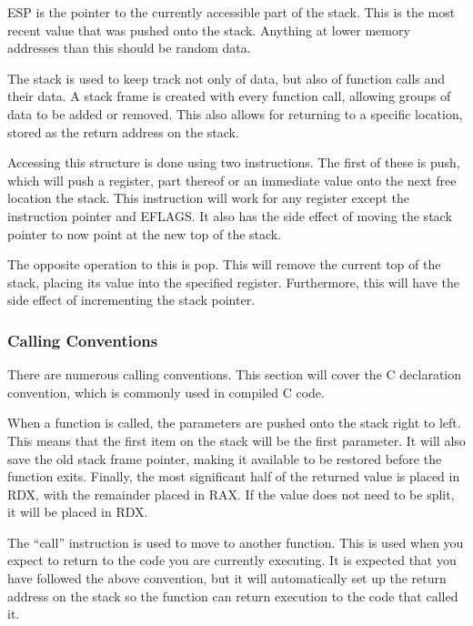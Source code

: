 				ESP is the pointer to the currently accessible part of the stack. 
				This is the most recent value that was pushed onto the stack. 
				Anything at lower memory addresses than this should be random data. 
				
				The stack is used to keep track not only of data, but also of function calls and their data. 
				A stack frame is created with every function call, allowing groups of data to be added or removed. 
				This also allows for returning to a specific location, stored as the return address on the stack. 

				Accessing this structure is done using two instructions. 
				The first of these is push, which will push a register, part thereof or an immediate value onto the next free location the stack. 
				This instruction will work for any register except the instruction pointer and EFLAGS. 
				It also has the side effect of moving the stack pointer to now point at the new top of the stack. 

				The opposite operation to this is pop. 
				This will remove the current top of the stack, placing its value into the specified register. 
				Furthermore, this will have the side effect of incrementing the stack pointer. 

			\subsubsection{Calling Conventions}
				There are numerous calling conventions. 
				This section will cover the C declaration convention, which is commonly used in compiled C code. 

				When a function is called, the parameters are pushed onto the stack right to left. 
				This means that the first item on the stack will be the first parameter. 
				It will also save the old stack frame pointer, making it available to be restored before the function exits. 
				Finally, the most significant half of the returned value is placed in RDX, with the remainder placed in RAX. 
				If the value does not need to be split, it will be placed in RDX. 

				The ``call'' instruction is used to move to another function. 
				This is used when you expect to return to the code you are currently executing.
				It is expected that you have followed the above convention, but it will automatically set up the return address on the stack so the function can return execution to the code that called it. 


